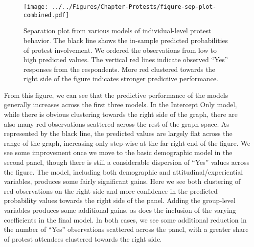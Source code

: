 			\begin{figure}[t]
				\centering\texttt{[image: ../../Figures/Chapter-Protests/figure-sep-plot-combined.pdf]}
				\caption{Separation plot from various models of individual-level protest behavior. The black line shows the in-sample predicted probabilities of protest involvement. We ordered the observations from low to high predicted values. The vertical red lines indicate observed ``Yes'' responses from the respondents. More red clustered towards the right side of the figure indicates stronger predictive performance.}
				\label{fig:sepplotcombined}
			\end{figure}
			
			From this figure, we can see that the predictive performance of the models generally increases across the first three models. In the Intercept Only model, while there is obvious clustering towards the right side of the graph, there are also many red observations scattered across the rest of the graph space. As represented by the black line, the predicted values are largely flat across the range of the graph, increasing only step-wise at the far right end of the figure. We see some improvement once we move to the basic demographic model in the second panel, though there is still a considerable dispersion of ``Yes'' values across the figure. The model, including both demographic and attitudinal/experiential variables, produces some fairly significant gains. Here we see both clustering of red observations on the right side and more confidence in the predicted probability values towards the right side of the panel. Adding the group-level variables produces some additional gains, as does the inclusion of the varying coefficients in the final model. In both cases, we see some additional reduction in the number of ``Yes'' observations scattered across the panel, with a greater share of protest attendees clustered towards the right side.  
			
			
			
